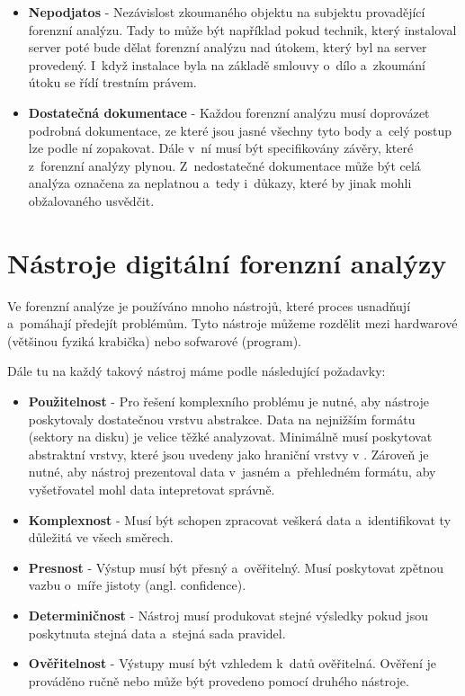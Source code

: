 \documentclass[thesis=B,czech]{FITthesis}[2012/06/26]
\begin{document}
\begin{itemize}
\item \textbf{Nepodjatos} - Nezávislost zkoumaného objektu na subjektu provadějící forenzní analýzu. Tady to může být například pokud technik, který instaloval server poté bude dělat forenzní analýzu nad útokem, který byl na server provedený. I~když instalace byla na základě smlouvy o~dílo a~zkoumání útoku se řídí trestním právem. 

\item \textbf{Dostatečná dokumentace} - Každou forenzní analýzu musí doprovázet podrobná dokumentace, ze které jsou jasné všechny tyto body a~celý postup lze podle ní zopakovat. Dále v~ní musí být specifikovány závěry, které z~forenzní analýzy plynou. Z~nedostatečné dokumentace může být celá analýza označena za neplatnou a~tedy i~důkazy, které by jinak mohli obžalovaného usvědčit.

\end{itemize}


\chapter{Nástroje digitální forenzní analýzy} 
\label{body}
Ve forenzní analýze je používáno mnoho nástrojů, které proces usnadňují a~pomáhají předejít problémům. Tyto nástroje můžeme rozdělit mezi hardwarové (většinou fyziká krabička) nebo sofwarové (program).

Dále tu na každý takový nástroj máme podle \cite{for_need} následující požadavky:

\begin{itemize}
\item \textbf{Použitelnost} - Pro řešení komplexního problému je nutné, aby nástroje poskytovaly dostatečnou vrstvu abstrakce. Data na nejnižším formátu (sektory na disku) je velice těžké analyzovat. Minimálně musí poskytovat abstraktní vrstvy, které jsou uvedeny jako hraniční vrstvy v \cite{carrier2003defining}. Zároveň je nutné, aby nástroj prezentoval data v~jasném a~přehledném formátu, aby vyšetřovatel mohl data intepretovat správně. \cite{carrier2003defining}
\item \textbf{Komplexnost} - Musí být schopen zpracovat veškerá data a~identifikovat ty důležitá ve všech směrech.
\item \textbf{Presnost} - Výstup musí být přesný a~ověřitelný. Musí poskytovat zpětnou vazbu o~míře jistoty (angl. confidence).
\item \textbf{Determiničnost} - Nástroj musí produkovat stejné výsledky pokud jsou poskytnuta stejná data a~stejná sada pravidel.
\item \textbf{Ověřitelnost} - Výstupy musí být vzhledem k~datů ověřitelná. Ověření je prováděno ručně nebo může být provedeno pomocí druhého nástroje.
\end{itemize}
\end{document}
